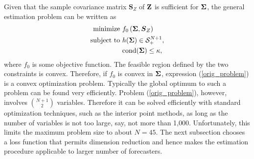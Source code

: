 \documentclass[11pt]{article}
\theoremstyle{definition}
\theoremstyle{definition}
\def\bSigma{{\bf \Sigma}}
\def\Z{{\bf Z}}
\def\cond{\text{cond}}
\begin{document}
Given that the sample covariance matrix $\boldsymbol{S}_Z$ of $\Z$ is sufficient for $\bSigma$, the general estimation problem can be written as
\begin{align}
\label{orig_problem}
\begin{split}
\text{minimize } &  f_0 \left(\bSigma, \boldsymbol{S}_Z\right) \\
\text{subject to } & h(\bSigma) \in \mathcal{S}_{+}^{N+1}, \\
& \cond(\bSigma) \leq \kappa,
\end{split}
\end{align}
where $f_0$ is some objective function. The feasible region defined by the two constraints is convex. Therefore,
if $f_0$ is convex in $\bSigma$, expression (\ref{orig_problem}) is a convex optimization problem. 
Typically the global optimum to such a problem can be found very efficiently. Problem (\ref{orig_problem}), however, involves $\binom{N+1}{2}$ variables. Therefore it can be solved efficiently with standard optimization techniques, such as the interior point methods, as long as the number of variables is not too large, say, not more than 1,000. Unfortunately, this limits the maximum problem size  to about $N = 45$. The next subsection chooses a loss function that permits dimension reduction and hence makes the estimation procedure applicable to larger number of forecasters. 
\end{document}
